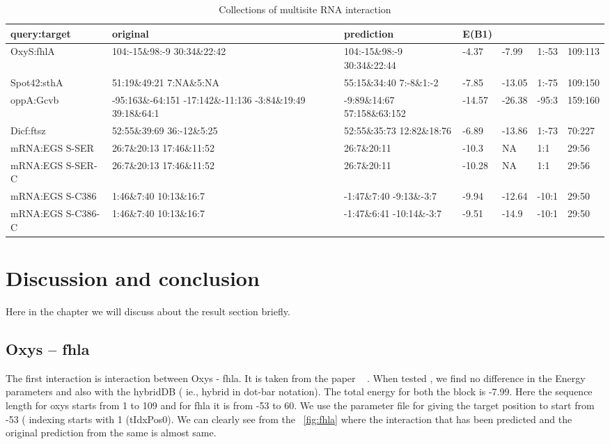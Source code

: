 \documentclass[twoside,a4paper]{report}
\begin{document}
	
\begin{table}[H]
	
	\label{table:2}
	\begin{tabular}{ p{2cm}p{2.8cm}|p{2.8cm}p{1cm}p{1cm}|p{1cm}p{1cm}}
		\hline
		query:target& original& prediction& \rotatebox[origin=c]{90} {E(B1)}  &\rotatebox[origin=c]{90}{E(B1+B2)}  &\rotatebox[origin=c]{90}{1st index}  &\rotatebox[origin=c]{90}{length} \\
		\hline
		OxyS:fhlA&104:-15\&98:-9 30:34\&22:42
		&104:-15\&98:-9 30:34\&22:44&-4.37 &-7.99 &1:-53&109:113\\
		\hline
		Spot42:sthA&51:19\&49:21  7:NA\&5:NA & 55:15\&34:40 7:-8\&1:-2
		& -7.85 &-13.05 & 1:-75 &109:150 \\
		\hline
		oppA:Gcvb &-95:163\&-64:151 -17:142\&-11:136 -3:84\&19:49 39:18\&64:1  &-9:89\&14:67 57:158\&63:152
		& -14.57 &-26.38 & -95:3 &159:160\\
		\hline
		Dicf:ftsz&52:55\&39:69   \hbox{36:-12\&5:25}  &52:55\&35:73 12:82\&18:76	& -6.89 &-13.86 &1:-73 &70:227 \\
		\hline
		mRNA:EGS S-SER &26:7\&20:13 17:46\&11:52  &26:7\&20:11 & -10.3 &NA & 1:1 &29:56 \\
		\hline
		mRNA:EGS S-SER-C &26:7\&20:13 17:46\&11:52  &26:7\&20:11 & -10.28 &NA & 1:1 &29:56 \\
		\hline
		mRNA:EGS S-C386 &1:46\&7:40 10:13\&16:7 &-1:47\&7:40 \hbox{-9:13\&-3:7}
		  & -9.94 &-12.64 & -10:1 &29:50 \\
		\hline
		mRNA:EGS S-C386-C &1:46\&7:40 10:13\&16:7
		 &-1:47\&6:41 \hbox{-10:14\&-3:7}
		  & -9.51 &-14.9 & -10:1 &29:50 \\
		\hline
	\end{tabular}
	\caption{Collections of multisite RNA interaction }	
\end{table}


	
	\chapter{Discussion and conclusion}
	
	Here in the chapter we will discuss about the result section briefly.
	
	
	\section{Oxys – fhla}
	 The first interaction is interaction between Oxys - fhla. It is taken from the paper ~\cite{argaman2000fhla} .   When tested , we find no difference in the Energy parameters and also with the hybridDB ( ie., hybrid in dot-bar notation). The total energy for both the block is -7.99. Here the sequence length for oxys starts from 1 to 109 and for fhla it is from -53 to 60. We use the parameter file for giving the target position to start from -53 ( indexing starts with 1 (tIdxPos0). We can clearly see from the ~\ref{fig:fhla} where the interaction that has been predicted and the original prediction from the same is almost same. \\
	 
\end{document}
